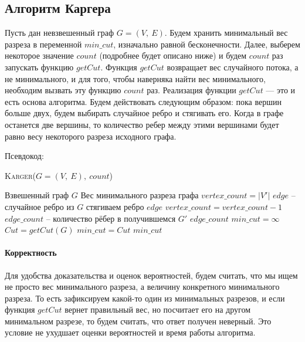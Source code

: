 \documentclass[a4paper,12pt]{article}
\newcommand{\algname}[1]{\textsc{#1}}
\begin{document}
\subsection{Алгоритм Каргера}

Пусть дан невзвешенный граф $G = (V,\ E)$. Будем хранить минимальный вес разреза в переменной $min\_cut$, изначально равной бесконечности. Далее, выберем некоторое значение $count$ (подробнее будет описано ниже) и будем $count$ раз запускать функцию $getCut$.
Функция $getCut$ возвращает вес случайного потока, а не минимального, и для того, чтобы наверняка найти вес минимального, необходим вызвать эту функцию $count$ раз. Реализация функции $getCut$ — это и есть основа алгоритма. Будем действовать следующим образом: пока вершин больше двух, будем выбирать случайное ребро и стягивать его. Когда в графе останется две вершины, то количество ребер между этими вершинами будет равно весу некоторого разреза исходного графа. 

Псевдокод:

\begin{algorithm}[H]
  	\caption{\algname{Karger}($G = (V,\ E),\ count$)}
	\begin{algorithmic}[1]
        \Require Взвешенный граф $G$
        \Ensure Вес минимального разреза графа
        \State 
            \State $vertex\_count = |V'|$
                \State $edge$ -- случайное ребро из $G$
                \State стягиваем ребро $edge$
                \State $vertex\_count = vertex\_count - 1$
            \EndWhile
            \State $edge\_count$ -- количество рёбер в получившемся $G'$
            \State \Return $edge\_count$
        \EndFunction
        \State 
        \State 
        \State $min\_cut = \infty$
            \State $Cut = getCut(G)$
                \State $min\_cut = Cut$
            \EndIf
        \EndFor
        \State \Return $min\_cut$
	\end{algorithmic}
\end{algorithm}

\paragraph{Корректность}

 Для удобства доказательства и оценок вероятностей, будем считать, что мы ищем не просто вес минимального разреза, а величину конкретного минимального разреза. То есть зафиксируем какой-то один из минимальных разрезов, и если функция $getCut$ вернет правильный вес, но посчитает его на другом минимальном разрезе, то будем считать, что ответ получен неверный. Это условие не ухудшает оценки вероятностей и время работы алгоритма.
 
\end{document}
